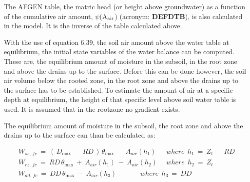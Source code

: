 \documentclass[11pt]{article}
\begin{document}
\bigskip
\bigskip
The AFGEN table, the matric head (or height above groundwater) as a function of the
cumulative air amount, $\psi$(A$_{{\rm air}}$) (acronym: {\bf DEFDTB}), is also calculated in the model. It is
the inverse of the table calculated above.

\bigskip
\bigskip
With the use of equation 6.39, the soil air amount above the water table at equilibrium,
the initial state variables of the water balance can be computed. These are, the equilibri\-um amount of moisture in the subsoil, in the root zone and above the drains up to the
surface. Before this can be done however, the soil air volume below the rooted zone, in
the root zone and above the drains up to the surface has to be established. To estimate the
amount of air at a specific depth at equilibrium, the height of that specific level above soil
water table is used. It is assumed that in the rootzone no gradient exists. 

\bigskip
\bigskip
\bigskip
\bigskip
\bigskip
\bigskip
\bigskip
\bigskip
\bigskip
\bigskip
The equilibrium amount of moisture in the subsoil, the root zone and above the drains up
to the surface can than be calculated as:

\begin{eqnarray*}
 W _{ss,\, fc} ~=~ (\, D _{\max } ~-~ RD\, )\, \theta  _{\max } ~-~ A _{air} (h _{1} )~~\, ~~~~where~~h _{1} ~=~Z _{t~} -~RD  \nonumber  \\
W _{rz,\, fc} ~=~ RD\, \theta  _{\max } ~+~A _{air} (h _{1} )~-~A _{air} (h _{2} )~~~~~~where~~h _{2} ~=~Z _{t} \nonumber  \\
W _{dd,\, fc} ~=~ DD\, \theta  _{\max } ~-~A _{air} (h _{3} )~~\, ~~~~~~~~~~~~~where~~h _{3} ~=~DD
\end{eqnarray*}
\end{document}
